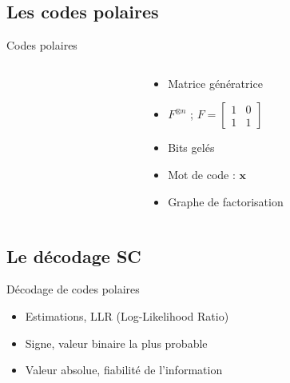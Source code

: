 \subsection*{Les codes polaires}
\begin{frame}[c]{Codes polaires}
	\begin{columns}[T] %
		\begin{column}{.65\textwidth}
		\end{column}
		\begin{column}{.35\textwidth}
		\begin{itemize}
			\item<1-> Matrice génératrice
			\item<1->$F^{\otimes n}$ ; $F=\left[\begin{smallmatrix} 1 & 0 \\ 1 & 1\end{smallmatrix}\right]$
			\item<2-> Bits gelés
			\item<3-> Mot de code : $\mathbold{x}$
			\item<4-> Graphe de factorisation
		\end{itemize}
		\end{column}

	\end{columns}

\end{frame}
\subsection*{Le décodage SC}

\begin{frame}[c]{Décodage de codes polaires}
	\begin{itemize}
		\item<2> Estimations, LLR (Log-Likelihood Ratio)
		\item<2> Signe, valeur binaire la plus probable
		\item<2> Valeur absolue, fiabilité de l'information
	\end{itemize}
\end{frame}

